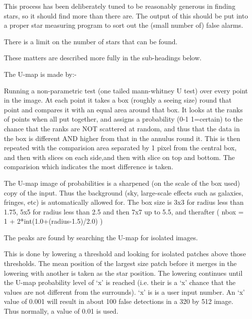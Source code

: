 \begin{small}
{{ This process has been deliberately tuned to be reasonably generous
 in finding stars, so it should find more than there are. The output
 of this should be put into a proper star measuring program to
 sort out the (small number of) false alarms.
 
 There is a limit on the number of stars that can be found.
 
 These matters are described more fully in the sub-headings below.
 
 
 \vspace*{1mm}
 \hspace*{2em}{\bf U-Map}
 \vspace*{1mm}
 
  The U-map is made by:-
 
 Running a non-parametric test (one tailed mann-whitney U test)
 over every point in the image. At each point it takes a box
 (roughly a seeing size) round that point and compares it with
 an equal area around that box. It looks at the ranks of points
 when all put together, and assigns a probability
 (0-1 1=certain) to the chance that the ranks are NOT scattered
 at random, and thus that the data in the box is different
 AND higher from that in the annulus round it. This is then
 repeated with the comparision area separated by 1 pixel from
 the central box, and then with slices on each side,and then
 with slice on top and bottom. The comparision which indicates
 the most difference is taken.
 
 The U-map image of probabilities is a sharpened (on the scale
 of the box used) copy of the input. Thus the background (sky,
 large-scale effects such as galaxies, fringes, etc) is
 automatically allowed for. The box size is 3x3 for radius less
 than 1.75, 5x5 for radius less than 2.5 and then 7x7 up to 5.5,
 and therafter  ( nbox = 1 + 2*int(1.0+(radius-1.5)/2.0) )
 
 \vspace*{1mm}
 \hspace*{2em}{\bf Peaks}
 \vspace*{1mm}
 
 The peaks are found by searching the U-map for isolated images.
 
 This is done
    by lowering a threshold and looking for isolated patches
    above those thresholds. The mean position of the largest size
    patch before it merges in the lowering with another is taken
    as the star position. The lowering continues until the U-map
    probability level of `x' is reached (i.e. their is a `x' chance
    that the values are not different from the surrounds). `x' is
    is a user input number. An `x' value of 0.001 will result in
    about 100 false detections in a 320 by 512 image. Thus
    normally, a value of 0.01 is used.
 
}}
\end{small}

